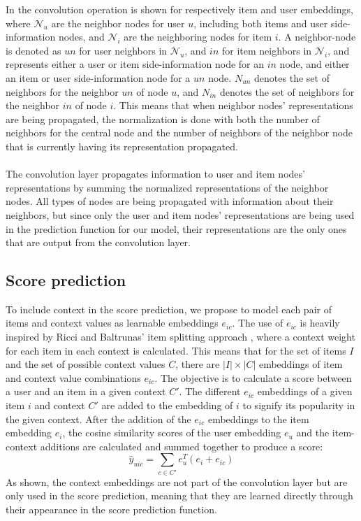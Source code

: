 In  the convolution operation is shown for respectively item and user embeddings, where $\mathcal{N}_{u}$ are the neighbor nodes for user $u$, including both items and user side-information nodes, and $\mathcal{N}_{i}$ are the neighboring nodes for item $i$.
A neighbor-node is denoted as $un$ for user neighbors in $\mathcal{N}_{u}$, and $in$ for item neighbors in $\mathcal{N}_{i}$, and represents either a user or item side-information node for an $in$ node, and either an item or user side-information node for a $un$ node.
$N_{un}$ denotes the set of neighbors for the neighbor $un$ of node $u$, and $N_{in}$ denotes the set of neighbors for the neighbor $in$ of node $i$.
This means that when neighbor nodes' representations are being propagated, the normalization is done with both the number of neighbors for the central node and the number of neighbors of the neighbor node that is currently having its representation propagated.
\\\\
The convolution layer propagates information to user and item nodes' representations by summing the normalized representations of the neighbor nodes.
All types of nodes are being propagated with information about their neighbors, but since only the user and item nodes' representations are being used in the prediction function for our model, their representations are the only ones that are output from the convolution layer.

\subsection{Score prediction}\label{subsec:csgcn_is_score_prediction}
To include context in the score prediction, we propose to model each pair of items and context values as learnable embeddings $e_{ic}$.
The use of $e_{ic}$ is heavily inspired by Ricci and Baltrunas' item splitting approach \cite{baltrunasitemsplitting}, where a context weight for each item in each context is calculated.
This means that for the set of items $I$ and the set of possible context values $C$, there are $|I| \times |C|$ embeddings of item and context value combinations $e_{ic}$.
The objective is to calculate a score between a user and an item in a given context $C'$.
The different $e_{ic}$ embeddings of a given item $i$ and context $C'$ are added to the embedding of $i$ to signify its popularity in the given context.
After the addition of the $e_{ic}$ embeddings to the item embedding $e_i$, the cosine similarity scores of the user embedding $e_u$ and the item-context additions are calculated and summed together to produce a score: 
\begin{equation}
  \hat{y}_{uic} = \sum_{c \in C'} e_u^T(e_i+e_{ic})
\end{equation}
As shown, the context embeddings are not part of the convolution layer but are only used in the score prediction, meaning that they are learned directly through their appearance in the score prediction function.


